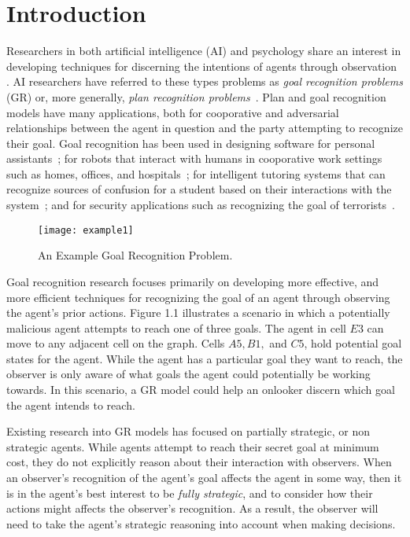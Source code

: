 \chapter{Introduction}


Researchers in both artificial intelligence (AI) and psychology share an interest in developing techniques for discerning the intentions of agents through observation \cite{schmidt:78,kautz:87}. AI researchers have referred to these types problems as \emph{goal recognition problems} (GR) or, more generally, \emph{plan recognition problems}~\cite{Sukthankar:14}. 
Plan and goal recognition models have many applications, both for cooporative and adversarial relationships between the agent in question and the party attempting to recognize their goal. Goal recognition has been used in designing software for personal assistants~\cite{oh:10,oh:11,oh:11b}; for
robots that interact with humans in cooporative work settings such as homes, offices, and hospitals~\cite{tavakkoli:07,kelley:12}; 
for intelligent tutoring systems that can recognize sources of confusion for a student based on
their interactions with the system~\cite{mcquiggan:08,johnson:10,lee:12,min:14}; and for security applications such as recognizing the goal of terrorists~\cite{jarvis:05}. 

\begin{figure}[h!]
\begin{center}

  \texttt{[image: example1]}
  \end{center}

  \caption{An Example Goal Recognition Problem.}
  \label{fig:example1}
\end{figure}


Goal recognition research focuses primarily on developing more effective, and more
efficient techniques for recognizing the goal of an agent through observing the agent's prior actions. Figure 1.1 illustrates a scenario in which a potentially malicious agent attempts to reach one of three goals. The agent in cell $E3$ can move to any adjacent cell on the graph. Cells $A5, B1,$ and $C5$, hold potential goal states for the agent. While the agent has a particular goal they want to reach, the observer is only aware of what goals the agent could potentially be working towards. In this scenario, a GR model could help an onlooker discern which goal the agent intends to reach.

Existing research into GR models has focused on partially strategic, or non strategic agents. While agents attempt to reach their secret goal at minimum cost, they do not explicitly reason about their interaction with observers.
When an observer's recognition of the agent's goal affects the agent in some way, 
then it is in the agent's best interest to be \emph{fully strategic}, and to
consider how their actions might affects the observer's recognition. 
As a result, the observer will need to take the agent's strategic reasoning into account when making decisions.

